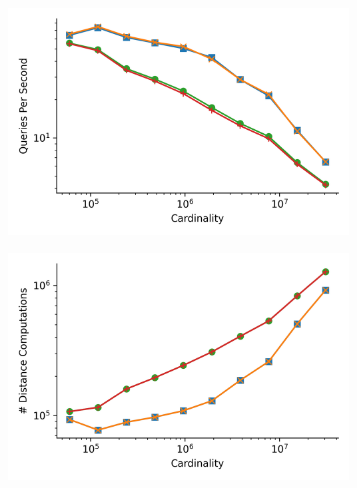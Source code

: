 \begin{figure}
    \begin{subfigure}[b]{0.5\textwidth}
        \includegraphics[width=0.99\textwidth]{images/distance_counts/fashion-mnist_KnnRepeatedRnn_10_throughput.png}
        \label{fig:results:fashion-mnist-counts-throughput}
    \end{subfigure}%
    \begin{subfigure}[b]{0.5\textwidth}
        \includegraphics[width=0.99\textwidth]{images/distance_counts/fashion-mnist_KnnRepeatedRnn_10_counts.png}
        \label{fig:results:glove-25-counts-counts}
    \end{subfigure}%
    \\
    \begin{subfigure}[b]{0.5\textwidth}

\end{subfigure}
\end{figure}
